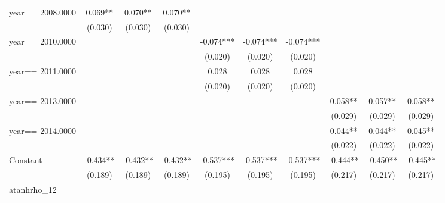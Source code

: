 \begin{table}[htbp]
\begin{tabular}{l*{9}{c}}
year==  2008.0000   &       0.069** &       0.070** &       0.070** &               &               &               &               &               &               \\
                    &     (0.030)   &     (0.030)   &     (0.030)   &               &               &               &               &               &               \\
year==  2010.0000   &               &               &               &      -0.074***&      -0.074***&      -0.074***&               &               &               \\
                    &               &               &               &     (0.020)   &     (0.020)   &     (0.020)   &               &               &               \\
year==  2011.0000   &               &               &               &       0.028   &       0.028   &       0.028   &               &               &               \\
                    &               &               &               &     (0.020)   &     (0.020)   &     (0.020)   &               &               &               \\
year==  2013.0000   &               &               &               &               &               &               &       0.058** &       0.057** &       0.058** \\
                    &               &               &               &               &               &               &     (0.029)   &     (0.029)   &     (0.029)   \\
year==  2014.0000   &               &               &               &               &               &               &       0.044** &       0.044** &       0.045** \\
                    &               &               &               &               &               &               &     (0.022)   &     (0.022)   &     (0.022)   \\
Constant            &      -0.434** &      -0.432** &      -0.432** &      -0.537***&      -0.537***&      -0.537***&      -0.444** &      -0.450** &      -0.445** \\
                    &     (0.189)   &     (0.189)   &     (0.189)   &     (0.195)   &     (0.195)   &     (0.195)   &     (0.217)   &     (0.217)   &     (0.217)   \\
\hline
atanhrho\_12         &               &               &               &               &               &               &               &               &               \\

\end{tabular}
\end{table}
